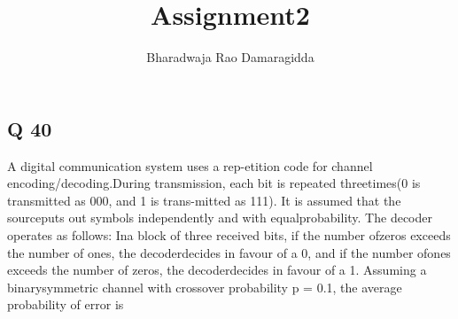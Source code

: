 \documentclass[11pt,a4,twocolumn]{article}
\title{Assignment2}
\author{Bharadwaja Rao Damaragidda}
\begin{document}
\maketitle
\begin{flushleft}
\section*{Q 40}
A digital communication system uses a rep-etition code for channel encoding/decoding.During transmission, each bit is repeated threetimes(0 is transmitted as 000, and 1 is trans-mitted as 111). It is assumed that the sourceputs out symbols independently and with equalprobability. The decoder operates as follows: Ina block of three received bits, if the number ofzeros exceeds the number of ones, the decoderdecides in favour of a 0, and if the number ofones exceeds the number of zeros, the decoderdecides in favour of a 1. Assuming a binarysymmetric channel with crossover probability p = 0.1, the average probability of error is

\end{flushleft}
\end{document}
